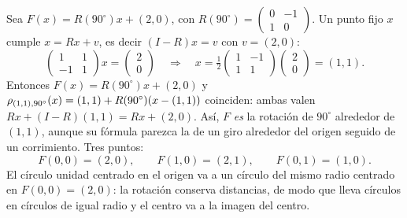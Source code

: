 \begin{ejemplo}\label{ej:circulo-descentrado}
Sea \(F(x)=R(90^\circ)x+(2,0)\), con \(R(90^\circ)=\left(\begin{smallmatrix}0&-1\\1&0\end{smallmatrix}\right)\).
Un punto fijo \(x\) cumple \(x=Rx+v\), es decir \((I-R)x=v\) con \(v=(2,0)\):
\[
\begin{pmatrix}1&1\\-1&1\end{pmatrix}x=\begin{pmatrix}2\\0\end{pmatrix}
\quad\Longrightarrow\quad
x=\tfrac12\begin{pmatrix}1&-1\\1&1\end{pmatrix}\begin{pmatrix}2\\0\end{pmatrix}=(1,1).
\]
Entonces \(F(x)=R(90^\circ)x+(2,0)\) y \(\rho_{(1,1),90^\circ}(x)=(1,1)+R(90^\circ)(x-(1,1))\)
coinciden: ambas valen \(Rx+(I-R)(1,1)=Rx+(2,0)\). Así, \(F\) \emph{es} la rotación de
\(90^\circ\) alrededor de \((1,1)\), aunque su fórmula parezca la de un giro alrededor del
origen seguido de un corrimiento. Tres puntos:
\[
F(0,0)=(2,0),\qquad F(1,0)=(2,1),\qquad F(0,1)=(1,0).
\]
El círculo unidad centrado en el origen va a un círculo del mismo radio centrado en
\(F(0,0)=(2,0)\): la rotación conserva distancias, de modo que lleva círculos en círculos de
igual radio y el centro va a la imagen del centro.
\end{ejemplo}

\begin{center}
\end{center}

